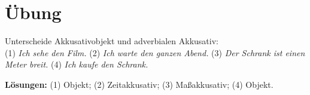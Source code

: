 \documentclass[a4paper,11pt]{article}
\begin{document}
\section{Übung}
Unterscheide Akkusativobjekt und adverbialen Akkusativ:\\
(1) \textit{Ich sehe den Film.} (2) \textit{Ich warte den ganzen Abend.} (3) \textit{Der Schrank ist einen Meter breit.} (4) \textit{Ich kaufe den Schrank.}

\textbf{Lösungen:} (1) Objekt; (2) Zeitakkusativ; (3) Maßakkusativ; (4) Objekt.
\end{document}
